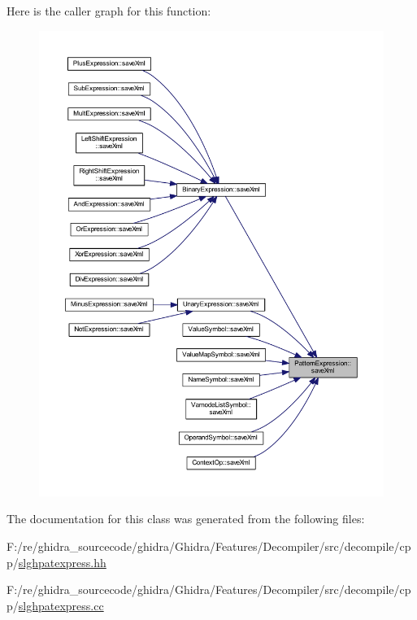 Here is the caller graph for this function\+:
\nopagebreak
\begin{figure}[H]
\begin{center}
\leavevmode
\includegraphics[width=350pt]{class_pattern_expression_a0d9c89ffbf4a22fac68189a845cde92a_icgraph}
\end{center}
\end{figure}


The documentation for this class was generated from the following files\+:\begin{DoxyCompactItemize}
\item 
F\+:/re/ghidra\+\_\+sourcecode/ghidra/\+Ghidra/\+Features/\+Decompiler/src/decompile/cpp/\mbox{\hyperlink{slghpatexpress_8hh}{slghpatexpress.\+hh}}\item 
F\+:/re/ghidra\+\_\+sourcecode/ghidra/\+Ghidra/\+Features/\+Decompiler/src/decompile/cpp/\mbox{\hyperlink{slghpatexpress_8cc}{slghpatexpress.\+cc}}\end{DoxyCompactItemize}
